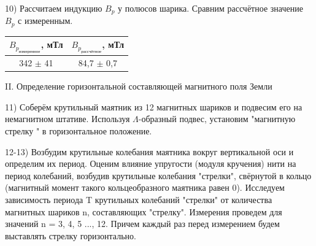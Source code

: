 \documentclass[a4paper,12pt]{article}
\begin{document}
10) Рассчитаем индукцию $B_p$ у полюсов шарика. Сравним рассчётное значение $B_p$ с измеренным.

\begin{center}
\begin{tabular}{|c|c|}
	\hline
	$B_{p_{измеренное}}$, мТл & $B_{p_{рассчётное}}$, мТл \\
	\hline
	342 $\pm$ 41 & 84,7 $\pm$ 0,7 \\ 
	\hline
\end{tabular}
\end{center}

II. Определение горизонтальной составляющей магнитного поля Земли

11) Соберём крутильный маятник из 12 магнитных шариков и подвесим его на немагнитном штативе. Используя $\Lambda$-образный подвес, установим "магнитную стрелку " в горизонтальное положение.


12-13) Возбудим крутильные колебания маятника вокруг вертикальной оси и определим их период. Оценим влияние упругости (модуля кручения) нити на период колебаний, возбудив крутильные колебания "стрелки", свёрнутой в кольцо (магнитный момент такого кольцеобразного маятника равен 0). Исследуем зависимость периода T крутильных колебаний "стрелки" от количества магнитных шариков n, составляющих "стрелку". Измерения проведем для значений n = 3, 4, 5 ..., 12. Причем каждый раз перед измерением будем выставлять стрелку горизонтально. 
\end{document}
